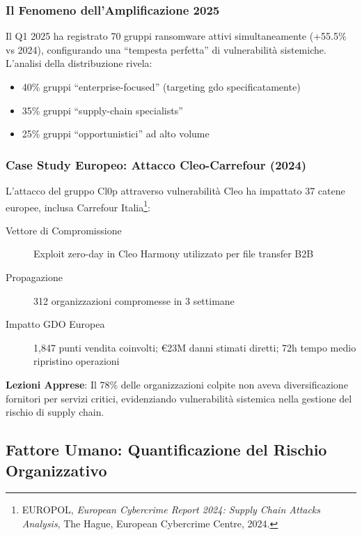 \subsubsection{Il Fenomeno dell'Amplificazione 2025}

Il Q1 2025 ha registrato 70 gruppi ransomware attivi simultaneamente (+55.5\% vs 2024), configurando una ``tempesta perfetta'' di vulnerabilità sistemiche. L'analisi della distribuzione rivela:

\begin{itemize}
    \item 40\% gruppi ``enterprise-focused'' (targeting \gls{gdo} specificatamente)
    \item 35\% gruppi ``supply-chain specialists''
    \item 25\% gruppi ``opportunistici'' ad alto volume
\end{itemize}

\subsubsection{Case Study Europeo: Attacco Cleo-Carrefour (2024)}

L'attacco del gruppo Cl0p attraverso vulnerabilità Cleo ha impattato 37 catene europee, inclusa Carrefour Italia\footnote{EUROPOL, \textit{European Cybercrime Report 2024: Supply Chain Attacks Analysis}, The Hague, European Cybercrime Centre, 2024.}:

\begin{description}
    \item[Vettore di Compromissione] Exploit zero-day in Cleo Harmony utilizzato per file transfer B2B
    \item[Propagazione] 312 organizzazioni compromesse in 3 settimane
    \item[Impatto GDO Europea] 1,847 punti vendita coinvolti; €23M danni stimati diretti; 72h tempo medio ripristino operazioni
\end{description}

\textbf{Lezioni Apprese}: Il 78\% delle organizzazioni colpite non aveva diversificazione fornitori per servizi critici, evidenziando vulnerabilità sistemica nella gestione del rischio di supply chain.

\subsection{Fattore Umano: Quantificazione del Rischio Organizzativo}
\label{subsec:fattore-umano}

